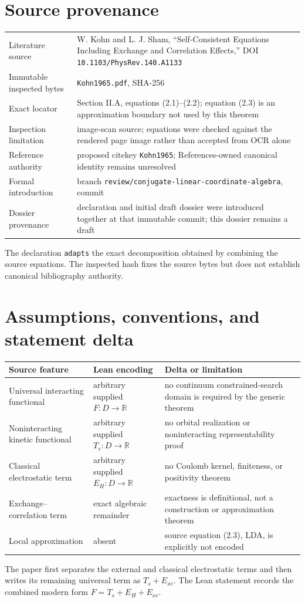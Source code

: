 \section{Source provenance}
\begin{tabularx}{\textwidth}{@{}lY@{}}
\toprule
Literature source & W. Kohn and L. J. Sham, ``Self-Consistent Equations Including Exchange and Correlation Effects,'' DOI \texttt{10.1103/PhysRev.140.A1133} \\
Immutable inspected bytes & \texttt{Kohn1965.pdf}, SHA-256  \\
Exact locator & Section II.A, equations (2.1)--(2.2); equation (2.3) is an approximation boundary not used by this theorem \\
Inspection limitation & image-scan source; equations were checked against the rendered page image rather than accepted from OCR alone \\
Reference authority & proposed citekey \texttt{Kohn1965}; References-owned canonical identity remains unresolved \\
Formal introduction & branch \texttt{review/conjugate-linear-coordinate-algebra}, commit  \\
Dossier provenance & declaration and initial draft dossier were introduced together at that immutable commit; this dossier remains a draft \\
\bottomrule
\end{tabularx}
The declaration \texttt{adapts} the exact decomposition obtained by combining the source equations.
The inspected hash fixes the source bytes but does not establish canonical bibliography authority.

\section{Assumptions, conventions, and statement delta}
\begin{tabularx}{\textwidth}{@{}YYY@{}}
\toprule
Source feature & Lean encoding & Delta or limitation \\
\midrule
Universal interacting functional & arbitrary supplied \(F:D\to\mathbb R\) & no continuum constrained-search domain is required by the generic theorem \\
Noninteracting kinetic functional & arbitrary supplied \(T_s:D\to\mathbb R\) & no orbital realization or noninteracting representability proof \\
Classical electrostatic term & arbitrary supplied \(E_H:D\to\mathbb R\) & no Coulomb kernel, finiteness, or positivity theorem \\
Exchange--correlation term & exact algebraic remainder & exactness is definitional, not a construction or approximation theorem \\
Local approximation & absent & source equation (2.3), LDA, is explicitly not encoded \\
\bottomrule
\end{tabularx}
The paper first separates the external and classical electrostatic terms and then writes its
remaining universal term as \(T_s+E_{xc}\).  The Lean statement records the combined modern form
\(F=T_s+E_H+E_{xc}\).

